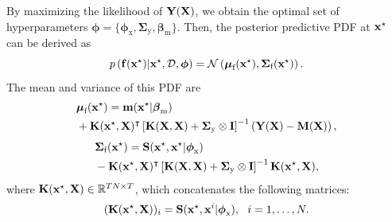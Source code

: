 \documentclass[iicol,sn-basic]{sn-jnl}%
\begin{document}
\begin{appendices}
By maximizing the likelihood of ${\bf Y}({\bf X})$, we obtain the optimal set of hyperparameters $\boldsymbol \phi=\{\boldsymbol \phi_{\text{x}},\boldsymbol{\Sigma}_\text{y},\boldsymbol \beta_{\text{m}}\}$.
Then, the posterior predictive PDF at ${\bf x}^\star$ can be derived as
\begin{equation}\label{eqnB4}
	p\left({\bf f}({\bf x}^\star)|{\bf x}^\star,\mathcal{D},\boldsymbol \phi\right) = \mathcal{N}\left(\boldsymbol{\mu}_\text{f}({\bf x}^\star),\boldsymbol{\Sigma}_\text{f}({\bf x}^\star)\right).
\end{equation}
The mean and variance of this PDF are
\begin{equation}\label{eqnB5}
	\begin{aligned}
		& \boldsymbol{\mu}_\text{f}({\bf x}^\star)={\bf m}({\bf x}^\star|\boldsymbol \beta_{\text{m}}) \\
		& + {\bf K}({\bf x}^\star,{\bf X})^\intercal \left[ {\bf K}({\bf X},{\bf X})+\boldsymbol{\Sigma}_\text{y} \otimes {\bf I}\right]^{-1} \left({\bf Y}({\bf X})-{\bf M} ({\bf X})\right),
	\end{aligned}
\end{equation}
\begin{equation}\label{eqnB6}
	\begin{aligned}
		& \boldsymbol{\Sigma}_\text{f}({\bf x}^\star)={\bf S}({\bf x}^\star,{\bf x}^\star|\boldsymbol \phi_{\text{x}})\\
		& -{\bf K}({\bf x}^\star,{\bf X})^\intercal \left[ {\bf K}({\bf X},{\bf X})+\boldsymbol{\Sigma}_\text{y} \otimes {\bf I}\right]^{-1} {\bf K}({\bf x}^\star,{\bf X}),
	\end{aligned}
\end{equation}
where ${\bf K}({\bf x}^\star,{\bf X}) \in \mathbb{R}^{TN \times T}$, which concatenates the following matrices:
\begin{equation}\label{eqnB7}
	({\bf K}({\bf x}^\star,{\bf X}))_i = {\bf S}({\bf x}^\star,{\bf x}^i|\boldsymbol \phi_{\text{x}}), \ \ i=1,\dots,N.
\end{equation}
\end{appendices}

\clearpage

\end{document}
